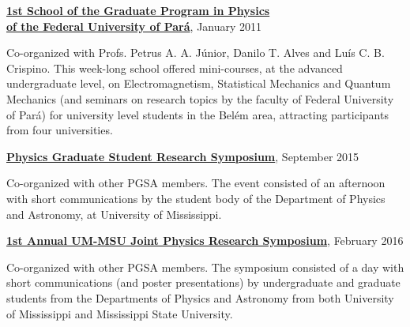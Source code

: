 \documentclass[10pt]{article}
\renewcommand{\section}[1]{\pagebreak[3]%
    \vspace{1.3\baselineskip}%
    \phantomsection\addcontentsline{toc}{section}{#1}%
    \noindent\llap{\scshape\smash{\parbox[t]{\marginparwidth}{\hyphenpenalty=10000\raggedright #1}}}%
    \vspace{-\baselineskip}\par}
\newcommand{\halfblankline}{\quad\vspace{-0.5\baselineskip}\pagebreak[3]}
\begin{document}
\halfblankline

\href{http://www.ufpa.br/ppgf/ippgf.html}
{\textbf{1st School of the Graduate Program in Physics \\ of the Federal University of Par\'a}},
\hfill{January 2011}

\begin{innerlist}
    \item Co-organized with Profs. Petrus A. A. J\'unior,
    Danilo T. Alves and Lu\'is C. B. Crispino. This week-long school offered
    mini-courses, at the advanced undergraduate level, on Electromagnetism,
    Statistical Mechanics and Quantum Mechanics (and seminars on research
    topics by the faculty of Federal University of Par\'a) for
    university level students in the Bel\'em area, attracting participants
    from four universities.
\end{innerlist}

\halfblankline

\href{http://dos.orgsync.com/org/pgsa/ResearchSymposium2015}
{\textbf{Physics Graduate Student Research Symposium}},
\hfill{September 2015}

\begin{innerlist}
    \item Co-organized with other PGSA members. The event consisted of an afternoon
    with short communications by the student body of the Department of Physics and
    Astronomy, at University of Mississippi.
\end{innerlist}

\halfblankline

\href{http://dos.orgsync.com/org/pgsa/UM_MSU_SYMP}
{\textbf{1st Annual UM-MSU Joint Physics Research Symposium}},
\hfill{February 2016}

\begin{innerlist}
    \item Co-organized with other PGSA members.
    The symposium consisted of a day with short communications (and poster presentations)
    by undergraduate and graduate students from the Departments of Physics
    and Astronomy from both University of Mississippi and Mississippi State
    University.
\end{innerlist}


\end{document}
